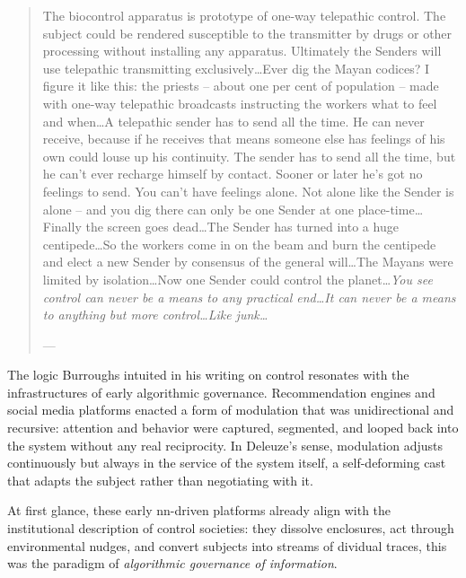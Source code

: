 \begin{quote}
	The biocontrol apparatus is prototype of one-way telepathic control. The subject could be rendered susceptible to the transmitter by drugs or other processing without installing any apparatus. Ultimately the Senders will use telepathic transmitting exclusively\ldots Ever dig the Mayan codices? I figure it like this: the priests -- about one per cent of population -- made with one-way telepathic broadcasts instructing the workers what to feel and when\ldots A telepathic sender has to send all the time. He can never receive, because if he receives that means someone else has feelings of his own could louse up his continuity. The sender has to send all the time, but he can't ever recharge himself by contact. Sooner or later he's got no feelings to send. You can't have feelings alone. Not alone like the Sender is alone -- and you dig there can only be one Sender at one place-time\ldots Finally the screen goes dead\ldots The Sender has turned into a huge centipede\ldots So the workers come in on the beam and burn the centipede and elect a new Sender by consensus of the general will\ldots The Mayans were limited by isolation\ldots Now one Sender could control the planet\ldots \textit{You see control can never be a means to any practical end\ldots It can never be a means to anything but more control\ldots Like junk\ldots}

	— \cite[81]{burroughs1979}
\end{quote}


The logic Burroughs intuited in his writing on control resonates with the infrastructures of early algorithmic governance. Recommendation engines and social media platforms enacted a form of modulation that was unidirectional and recursive: attention and behavior were captured, segmented, and looped back into the system without any real reciprocity. In Deleuze's sense, modulation adjusts continuously but always in the service of the system itself, a self-deforming cast that adapts the subject rather than negotiating with it.

At first glance, these early \gls{nn}-driven platforms already align with the institutional description of control societies: they dissolve enclosures, act through environmental nudges, and convert subjects into streams of dividual traces, this was the paradigm of \emph{algorithmic governance of information}.

